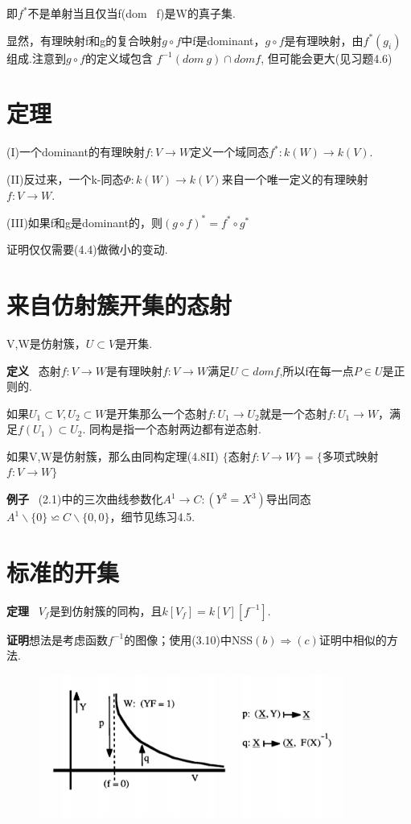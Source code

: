 \documentclass[UTF8]{book}
\begin{document}
即$f^{*}$不是单射当且仅当f(dom \ f)是W的真子集.

显然，有理映射f和g的复合映射$g\circ f$中f是dominant，$g\circ f$是有理映射，由$f^{*}(g_{i})$组成.注意到$g\circ f$的定义域包含 $f^{-1}(dom \ g)\cap dom f$, 但可能会更大(见习题4.6)
\section{定理}
(I)一个dominant的有理映射$f:V\rightarrow W$定义一个域同态$f^{*}:k(W)\rightarrow k(V)$.

(II)反过来，一个k-同态$\Phi: k(W)\rightarrow k(V)$来自一个唯一定义的有理映射$f:V\rightarrow W$.

(III)如果f和g是dominant的，则$(g\circ f)^{*}=f^{*}\circ g^{*}$

证明仅仅需要(4.4)做微小的变动.

\section{来自仿射簇开集的态射}
V,W是仿射簇，$U\subset V$是开集.

\textbf{定义} \ 态射$f:V\rightarrow W$是有理映射$f:V\rightarrow W$满足$U\subset dom f$,所以f在每一点$P\in U$是正则的.

如果$U_{1}\subset V,U_{2}\subset W$是开集那么一个态射$f:U_{1}\rightarrow U_{2}$就是一个态射$f:U_{1}\rightarrow W$，满足$f(U_{1})\subset U_{2}$. 同构是指一个态射两边都有逆态射.

如果V,W是仿射簇，那么由同构定理(4.8II)
\center  $\{$态射$f:V\rightarrow W\}=\{$多项式映射$f:V\rightarrow W\}$


\justifying
\textbf{例子} \ (2.1)中的三次曲线参数化$A^{1} \rightarrow C:(Y^{2}=X^{3}) $导出同态$A^{1}\backslash \{0\}\backsimeq C\backslash \{0,0\}$，细节见练习4.5.


\section{标准的开集}


\textbf{定理} \ $V_{f}$是到仿射簇的同构，且$k[V_{f}]=k[V][f^{-1}].$

\textbf{证明}想法是考虑函数$f^{-1}$的图像；使用(3.10)中NSS$(b)\Rightarrow(c)$证明中相似的方法.
\begin{figure}[h]
  \centering
  \includegraphics[width=10cm]{75.jpg}\\
\end{figure}
\end{document}
